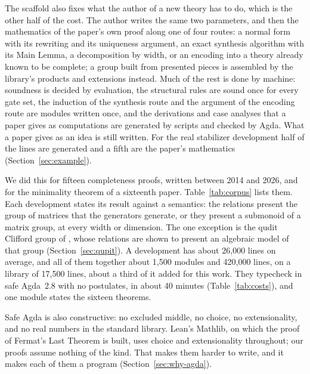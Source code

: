 The scaffold also fixes what the author of a new theory has to do,
which is the other half of the cost. The author writes the same two
parameters, and then the mathematics of the paper's own proof along
one of four routes: a normal form with its rewriting and its
uniqueness argument, an exact synthesis algorithm with its Main Lemma,
a decomposition by width, or an encoding into a theory already known
to be complete; a group built from presented pieces is assembled by
the library's products and extensions instead. Much of the rest is
done by machine: soundness is decided by evaluation, the structural
rules are sound once for every gate set, the induction of the
synthesis route and the argument of the encoding route are modules
written once, and the derivations and case analyses that a paper
gives as computations are generated by scripts and checked by Agda.
What a paper gives as an idea is still written. For the real
stabilizer development half of the lines are generated and a fifth are
the paper's mathematics (Section~\ref{sec:example}).

We did this for fifteen completeness proofs, written between 2014 and
2026, and for the minimality theorem of a sixteenth paper.
Table~\ref{tab:corpus} lists them. Each development states its result
against a semantics: the relations present the group of matrices that
the generators generate, or they present a submonoid of a matrix group,
at every width or dimension. The one exception is the qudit Clifford
group of \citet{bian2026qupit}, whose relations are shown to present an
algebraic model of that group (Section~\ref{sec:qupit}). A development
has about 26{,}000 lines on average, and all of them together about
1{,}500 modules and 420{,}000 lines, on a library of 17{,}500 lines,
about a third of it added for this work. They typecheck in safe
Agda~2.8 with no postulates, in about 40 minutes
(Table~\ref{tab:costs}), and one module states the sixteen theorems.

Safe Agda is also constructive: no excluded middle, no choice, no
extensionality, and no real numbers in the standard library. Lean's
Mathlib, on which the proof of Fermat's Last Theorem is built, uses
choice and extensionality throughout; our proofs assume nothing of the
kind. That makes them harder to write, and it makes each of them a
program (Section~\ref{sec:why-agda}).

